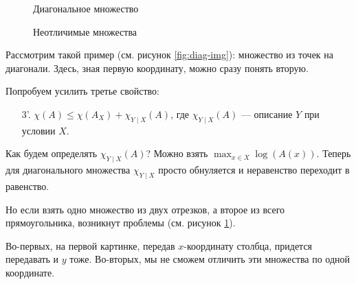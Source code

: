 \begin{figure}[h]
\begin{minipage}{0.5\textwidth}
    \centering
	\caption{Диагональное множество}
    \label{fig:diag-img}
\end{minipage}
\begin{minipage}{0.5\textwidth}
    \centering
	\caption{Неотличимые множества}
    \label{fig:corner-img}
\end{minipage}
\end{figure}
\begin{ex}
	Рассмотрим такой пример (см. рисунок \ref{fig:diag-img}): множество из точек на диагонали.
Здесь, зная первую координату, можно сразу понять вторую.
\end{ex}
Попробуем усилить третье свойство:
\begin{enumerate}
	\item[3'.] $ \chi(A) \le \chi(A_{X}) + \chi_{Y \mid X} (A)$, где $ \chi _{Y \mid X}(A)$ --- описание $ Y$ при условии $ X$.
\end{enumerate} 
Как будем определять $ \chi_{Y \mid X} (A)$?
Можно взять $ \max_{x \in X} \log(A(x))$.
Теперь для диагонального множества $ \chi_{Y \mid X}$ просто обнуляется и неравенство переходит в равенство.

\begin{ex}
	Но если взять одно множество из двух отрезков, а второе из всего прямоугольника, возникнут проблемы (см. рисунок \ref{fig:corner-img}). 

Во-первых, на первой картинке, передав $ x$-координату столбца, придется передавать  и $ y$ тоже. Во-вторых, мы не сможем отличить эти множества по одной координате.
\end{ex}

